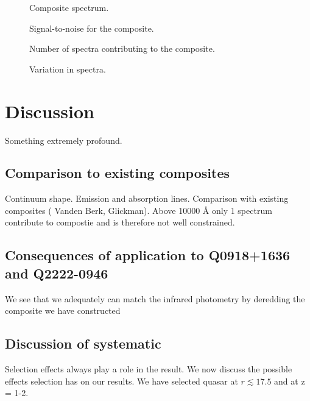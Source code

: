 \documentclass[iop]{emulateapj}
\begin{document}
 

 \begin{figure*}
 \caption{Composite spectrum.\label{composite}}
 \end{figure*}

 \begin{figure}
 \caption{Signal-to-noise for the composite.\label{sn}}
 \end{figure}

 \begin{figure}
 \caption{Number of spectra contributing to the composite.\label{number}}
 \end{figure}

 \begin{figure}
 \caption{Variation in spectra.\label{number}}
 \end{figure}


\section{Discussion}
Something extremely profound.



\subsection{Comparison to existing composites}
Continuum shape. Emission and absorption lines. Comparison with existing composites ( Vanden Berk, Glickman). Above 10000 \r{A} only 1 spectrum contribute to compostie and is therefore not well constrained. 


\subsection{Consequences of application to Q0918+1636 and Q2222-0946}
We see that we adequately can match the infrared photometry by deredding the composite we have constructed


\subsection{Discussion of systematic}

Selection effects always play a role in the result. We now discuss the possible effects selection has on our results. We have selected quasar at $r \lesssim 17.5$ and at z = 1-2. 
\end{document}
